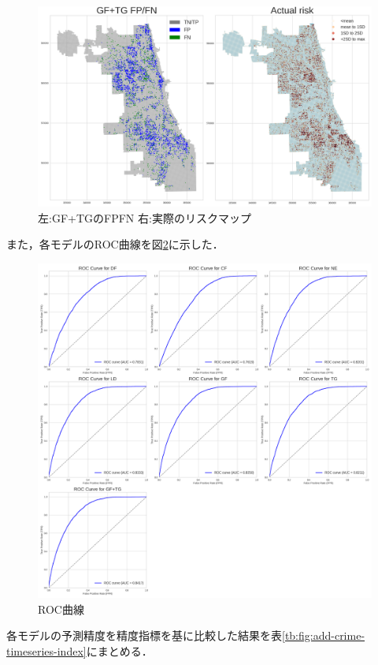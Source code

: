 \begin{figure}
  \centering %
  \includegraphics[scale=0.25]{./add-crime-timeseries-fig/GF+TG_fnp.png}
  \caption{左:GF+TGのFPFN 右:実際のリスクマップ}
  \label{fig:add-crime-timeseries-gf-tg-fnp}
\end{figure}
また，各モデルのROC曲線を図\ref{fig:add-crime-timeseries-roc}に示した．

\begin{figure}
  \centering %
  \includegraphics[scale=0.25]{./add-crime-timeseries-fig/roc_auc.png}
  \caption{ROC曲線}
  \label{fig:add-crime-timeseries-roc}
\end{figure}
各モデルの予測精度を精度指標を基に比較した結果を表\ref{tb:fig:add-crime-timeseries-index}にまとめる．

